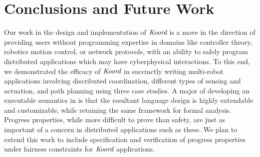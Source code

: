 \section{Conclusions and Future Work}

Our work in the design and implementation of $\emph{Koord}$ is a move in the direction of providing users without programming expertise in domains like controller theory, robotics motion control, or network protocols, with an ability to safely program distributed applications which may have cyberphysical interactions. To this end, we demonstrated the efficacy of $\emph{Koord}$ in succinctly writing multi-robot applications involving discributed coordination, different types of sensing and actuation, and path planning using three case studies.
       A major of developing an executable semantics in \K is that the resultant language design is highly extendable and customizable, while retaining the same framework for formal analysis. Progress properties, while more difficult to prove than safety, are just as important of a concern in distributed applications such as these. We plan to extend this work to include specification and verification of progress properties under fairness constraints for $\emph{Koord}$ applications.